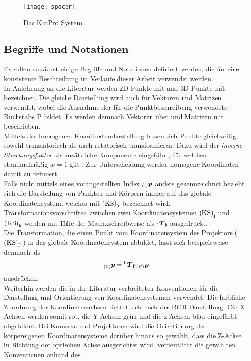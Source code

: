 \begin{figure}[ht]
	\begin{center}
		\texttt{[image: spacer]}
		\caption{Das KinPro System}
		\label{fig.kinpro}
	\end{center}
\end{figure}

\subsection{Begriffe und Notationen}
Es sollen zunächst einige Begriffe und Notationen definiert werden, die für eine konsistente Beschreibung im Verlaufe dieser Arbeit verwendet werden.\\
In Anlehnung an die Literatur \cite{Zhang2000} werden 2D-Punkte mit  und 3D-Punkte mit  bezeichnet. Die gleiche Darstellung wird auch für Vektoren und Matrizen verwendet, wobei die Ausnahme der für die Punktbeschreibung verwendete Buchstabe P bildet. Es werden demnach Vektoren über  und Matrizen mit  beschrieben.\\
Mittels der homogenen Koordinatendarstellung lassen sich Punkte gleichzeitig sowohl translatorisch als auch rotatorisch transformieren. Dazu wird der \textit{inverse Streckungsfaktor} als zusätzliche Komponente eingeführt, für welchen standardmäßig $w=1$ gilt \cite{Nischwitz20111}. Zur Unterscheidung werden homogene Koordinaten damit zu  \red[bzw.]  definiert.\\
Falls nicht mittels eines vorangestellten Index ${_{{\mathrm{(i)}}}}\mbox{\boldmath{$p$}}$ anders gekennzeichnet bezieht sich die Darstellung von Punkten und Körpern immer auf das globale Koordinatensystem, welches mit ${\mathrm{(KS)}}_{\mathrm{0}}$ bezeichnet wird. Transformationsvorschriften zwischen zwei Koordinatensystemen ${\mathrm{(KS)}}_{\mathrm{j}}$ und ${\mathrm{(KS)}}_{\mathrm{k}}$ werden mit Hilfe der Matrixschreibweise als ${^{\mathrm{j}}\mbox{\boldmath{$T$}}_{\mathrm{k}}}$ ausgedrückt.\\
Die Transformation, die einen Punkt vom Koordinatensystem des Projektors (${\mathrm{(KS)}}_{\mathrm{P}}$) in das globale Koordinatensystem abbildet, lässt sich beispielsweise demnach als
\red[\\P oder p? in 0]
\begin{equation}
{_{{\mathrm{(0)}}}}\mbox{\boldmath{$p$}} = {^{\mathrm{0}}\mbox{\boldmath{$T$}}_{\mathrm{P}}}{_{{\mathrm{(P)}}}}\mbox{\boldmath{$p$}}
\end{equation}
ausdrücken.\\
Weiterhin werden die in der Literatur verbreiteten Konventionen für die Darstellung und Orientierung von Koordinatensystemen verwendet: Die farbliche Zuordnung der Koordinatenachsen richtet sich nach der RGB Darstellung. Die X-Achsen werden somit rot, die Y-Achsen grün und die z-Achsen blau eingefärbt abgebildet. Bei Kameras und Projektoren wird die Orientierung der körpereigenen Koordinatensysteme darüber hinaus so gewählt, dass die Z-Achse in Richtung der optischen Achse ausgerichtet wird.  verdeutlicht die gewählten Konventionen anhand des .\\
